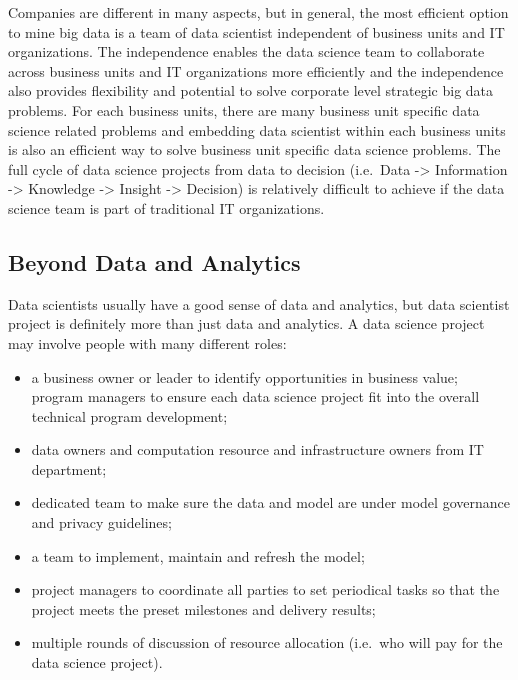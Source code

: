 \documentclass[
]{article}
\providecommand{\tightlist}{%
  \setlength{\itemsep}{0pt}\setlength{\parskip}{0pt}}
\begin{document}
Companies are different in many aspects, but in general, the most
efficient option to mine big data is a team of data scientist
independent of business units and IT organizations. The independence
enables the data science team to collaborate across business units and
IT organizations more efficiently and the independence also provides
flexibility and potential to solve corporate level strategic big data
problems. For each business units, there are many business unit specific
data science related problems and embedding data scientist within each
business units is also an efficient way to solve business unit specific
data science problems. The full cycle of data science projects from data
to decision (i.e.~Data -\textgreater{} Information -\textgreater{}
Knowledge -\textgreater{} Insight -\textgreater{} Decision) is
relatively difficult to achieve if the data science team is part of
traditional IT organizations.

\hypertarget{beyond-data-and-analytics}{%
\subsection{Beyond Data and Analytics}\label{beyond-data-and-analytics}}

Data scientists usually have a good sense of data and analytics, but
data scientist project is definitely more than just data and analytics.
A data science project may involve people with many different roles:

\begin{itemize}
\tightlist
\item
  a business owner or leader to identify opportunities in business
  value; program managers to ensure each data science project fit into
  the overall technical program development;
\item
  data owners and computation resource and infrastructure owners from IT
  department;
\item
  dedicated team to make sure the data and model are under model
  governance and privacy guidelines;
\item
  a team to implement, maintain and refresh the model;
\item
  project managers to coordinate all parties to set periodical tasks so
  that the project meets the preset milestones and delivery results;
\item
  multiple rounds of discussion of resource allocation (i.e.~who will
  pay for the data science project).
\end{itemize}
\end{document}
